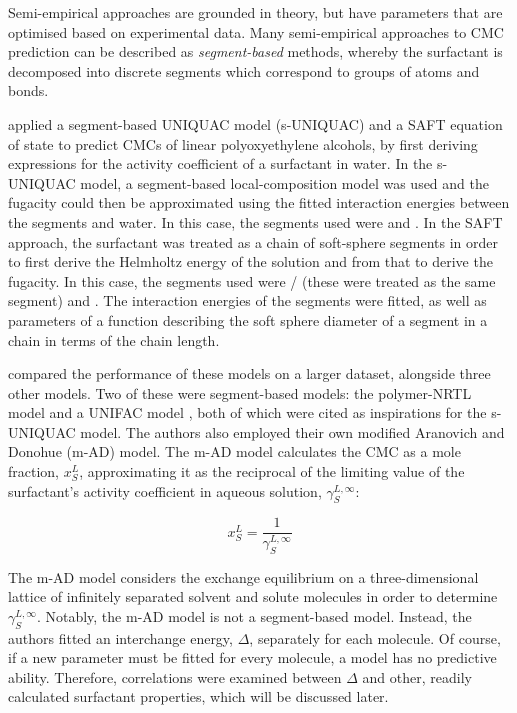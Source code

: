 Semi-empirical approaches are grounded in theory, but have parameters that are
optimised based on experimental data. Many semi-empirical approaches to CMC
prediction can be described as \emph{segment-based} methods, whereby the
surfactant is decomposed into discrete segments which correspond to groups of
atoms and bonds.

\citet{liStudiesUNIQUACSAFT1998} applied a segment-based UNIQUAC model
(s-UNIQUAC) and a SAFT equation of state to predict CMCs of linear
polyoxyethylene alcohols, by first deriving expressions for the activity
coefficient of a surfactant in water. In the s-UNIQUAC model, a segment-based
local-composition model was used and the fugacity could then be approximated
using the fitted interaction energies between the segments and water. In this
case, the segments used were  and . In the SAFT approach, the
surfactant was treated as a chain of soft-sphere segments in order to first
derive the Helmholtz energy of the solution and from that to derive the
fugacity. In this case, the segments used were / (these were
treated as the same segment) and . The interaction energies of the
segments were fitted, as well as parameters of a function describing the soft
sphere diameter of a segment in a chain in terms of the chain length.

\citet{chengCorrelationCriticalMicelle2005} compared the performance of these
models on a larger dataset, alongside three other models. Two of these were
segment-based models: the polymer-NRTL model \cite{liStudiesUNIQUACSAFT1998} and
a UNIFAC model \cite{voutsasPredictionCriticalMicelle2001}, both of which were
cited as inspirations for the s-UNIQUAC model. The authors also employed their
own modified Aranovich and Donohue (m-AD) model. The m-AD model calculates the
CMC as a mole fraction, $x_S^L$, approximating it as the reciprocal of the
limiting value of the surfactant's activity coefficient in aqueous solution,
$\gamma_S^{L,\infty}$:

\begin{equation}
    \label{eq:m-AD}
    x_S^L = \frac{1}{\gamma_S^{L,\infty}}
\end{equation}

The m-AD model considers the exchange equilibrium on a three-dimensional lattice
of infinitely separated solvent and solute molecules in order to determine
$\gamma_S^{L,\infty}$. Notably, the m-AD model is not a segment-based model.
Instead, the authors fitted an interchange energy, $\Delta$, separately for each
molecule. Of course, if a new parameter must be fitted for every molecule, a
model has no predictive ability. Therefore, correlations were examined between
$\Delta$ and other, readily calculated surfactant properties, which will be
discussed later.

